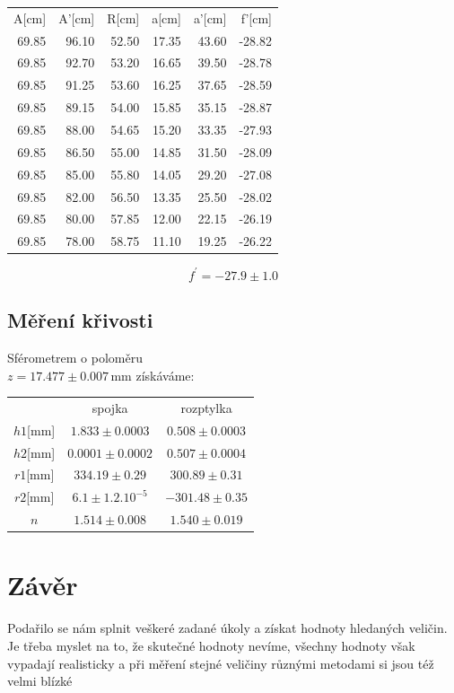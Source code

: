 \documentclass[czech,11pt,a4paper]{article}
\begin{document}
\begin{multicols}{2}
\begin{tabular}{rrrrr|r}

	 A[cm] & A'[cm] & R[cm] & a[cm] & a'[cm] & f'[cm] \\
	
	 69.85 & 96.10 & 52.50 & 17.35 & 43.60 & -28.82 \\
	 69.85 & 92.70 & 53.20 & 16.65 & 39.50 & -28.78 \\
	 69.85 & 91.25 & 53.60 & 16.25 & 37.65 & -28.59 \\
	 69.85 & 89.15 & 54.00 & 15.85& 35.15 & -28.87 \\
	 69.85 & 88.00 & 54.65& 15.20& 33.35 & -27.93 \\
	 69.85 & 86.50 & 55.00 & 14.85 & 31.50 & -28.09 \\
	 69.85 & 85.00 & 55.80 & 14.05 & 29.20 & -27.08 \\
	 69.85 & 82.00 & 56.50 & 13.35 & 25.50 & -28.02 \\
	 69.85 & 80.00 & 57.85 & 12.00 & 22.15 & -26.19 \\
	 69.85 & 78.00 & 58.75 & 11.10 & 19.25 & -26.22 \\
	
\end{tabular}
\begin{equation*}
	f^\prime = -27.9\pm 1.0
\end{equation*}
\subsection{Měření křivosti}

Sférometrem o poloměru \\$z = 17.477 \pm 0.007 \,\mathrm{mm}$ získáváme:

\begin{tabular}{ccc}
	& spojka               & rozptylka       \\
	$h1$[mm] & $1.833 \pm 0.0003  $   & $0.508\pm 0.0003 $\\
	$h2$[mm]& $0.0001 \pm 0.0002 $   & $0.507\pm 0.0004$ \\
	$r1$[mm] & $334.19\pm 0.29   $    & $300.89\pm 0.31$  \\
	$r2$[mm] & $6.1 \pm 1.2 .10^{-5} $& $-301.48\pm 0.35$ \\ \hline
$	n$  & $1.514 \pm 0.008 $     & $1.540\pm 0.019 $
\end{tabular}
		
		\section{Závěr}
		Podařilo se nám splnit veškeré zadané úkoly a získat hodnoty hledaných veličin. Je třeba myslet na to, že skutečné hodnoty nevíme, všechny hodnoty však vypadají realisticky a při měření stejné veličiny různými metodami si jsou též velmi blízké
		
	
		

		
		
		
		
		
	\end{multicols}
\end{document}
